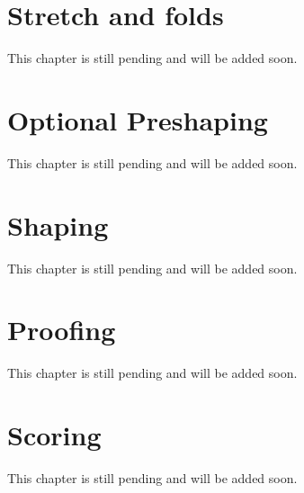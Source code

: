 \section{Stretch and folds}
This chapter is still pending and will be added soon.

\section{Optional Preshaping}
This chapter is still pending and will be added soon.

\section{Shaping}
This chapter is still pending and will be added soon.

\section{Proofing}
This chapter is still pending and will be added soon.

\section{Scoring}
This chapter is still pending and will be added soon.

